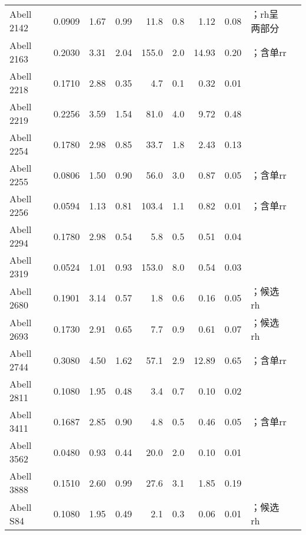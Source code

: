 \begin{ThreePartTable}
\begin{longtable}{lcccr@{$\,\pm\,$}lr@{$\,\pm\,$}lll}
Abell 2142           & 0.0909 & 1.67 & 0.99 &  11.8 &  0.8 &  1.12 &  0.08 & \parencite{venturi2017}；\acl{rh}呈两部分  \\
Abell 2163           & 0.2030 & 3.31 & 2.04 & 155.0 &  2.0 & 14.93 &  0.20 & \parencite{feretti2001}；含单\acl{rr}  \\
Abell 2218           & 0.1710 & 2.88 & 0.35 &   4.7 &  0.1 &  0.32 &  0.01 & \parencite{giovannini2000}  \\
Abell 2219           & 0.2256 & 3.59 & 1.54 &  81.0 &  4.0 &  9.72 &  0.48 & \parencite{bacchi2003}  \\
Abell 2254           & 0.1780 & 2.98 & 0.85 &  33.7 &  1.8 &  2.43 &  0.13 & \parencite{govoni2001}  \\
Abell 2255           & 0.0806 & 1.50 & 0.90 &  56.0 &  3.0 &  0.87 &  0.05 & \parencite{govoni2005}；含单\acl{rr}  \\
Abell 2256           & 0.0594 & 1.13 & 0.81 & 103.4 &  1.1 &  0.82 &  0.01 & \parencite{clarke2006}；含单\acl{rr}  \\
Abell 2294           & 0.1780 & 2.98 & 0.54 &   5.8 &  0.5 &  0.51 &  0.04 & \parencite{giovannini2009}  \\
Abell 2319           & 0.0524 & 1.01 & 0.93 & 153.0 &  8.0 &  0.54 &  0.03 & \parencite{feretti1997}  \\
Abell 2680           & 0.1901 & 3.14 & 0.57 &   1.8 &  0.6\tnote{e} &  0.16 &  0.05 & \parencite{duchesne2017}；候选\acl{rh}  \\
Abell 2693           & 0.1730 & 2.91 & 0.65 &   7.7 &  0.9\tnote{f} &  0.61 &  0.07 & \parencite{duchesne2017}；候选\acl{rh}  \\
Abell 2744           & 0.3080 & 4.50 & 1.62 &  57.1 &  2.9 & 12.89 &  0.65 & \parencite{govoni2001}；含单\acl{rr}  \\
Abell 2811           & 0.1080 & 1.95 & 0.48 &   3.4 &  0.7\tnote{g} &  0.10 &  0.02 & \parencite{duchesne2017}  \\
Abell 3411           & 0.1687 & 2.85 & 0.90 &   4.8 &  0.5 &  0.46 &  0.05 & \parencite{vanWeeren2013}；含单\acl{rr}  \\
Abell 3562           & 0.0480 & 0.93 & 0.44 &  20.0 &  2.0 &  0.10 &  0.01 & \parencite{venturi2003}  \\
Abell 3888           & 0.1510 & 2.60 & 0.99 &  27.6 &  3.1 &  1.85 &  0.19 & \parencite{shakouri2016}  \\
Abell S84            & 0.1080 & 1.95 & 0.49 &   2.1 &  0.3\tnote{h} &  0.06 &  0.01 & \parencite{duchesne2017}；候选\acl{rh}  \\

\end{longtable}
\end{ThreePartTable}
